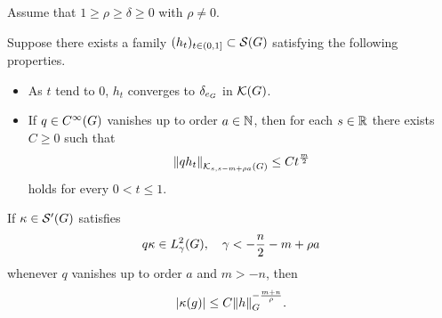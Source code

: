 \begin{theorem}
    Assume that $1 \geq \rho \geq \delta \geq 0$ with $\rho \neq 0$.

    Suppose there exists a family $(h_t)_{t \in (0, 1]} \subset \Schwartz \Group$
    satisfying the following properties.
    \begin{itemize}
        \item As $t$ tend to $0$, $h_t$ converges to $\delta_{e_\Group}$ in $\Kernels$.
        \item If $q \in \SmoothFunctions {\Group}$ vanishes up to order $a \in \N$,
            then for each $s \in \R$ there exists $C \geq 0$ such that
            \begin{align}
                \norm [\KernelsSobolev s {s - m + \rho a}] {q h_t}
                \leq C t^{\frac m 2}
                \label{eq:kernel_estimates:heat_kernel_condition}
            \end{align}
            holds for every $0 < t \leq 1$.
    \end{itemize}

    If $\kappa \in \TemperedDistributions \Group$ satisfies
    \begin{align}
        q \kappa \in \Sobolev \gamma,
        \quad \gamma < -\frac n 2 -m + \rho a
        \label{eq:kernel_estimates:assumption_on_the_kernel}
    \end{align}
    whenever $q$ vanishes up to order $a$ and $m > -n$,
    then
    \begin{align*}
        \abs{\kappa(g)} \leq C \norm [\Group] h^{-\frac{m + n} \rho}.
    \end{align*}
\end{theorem}
